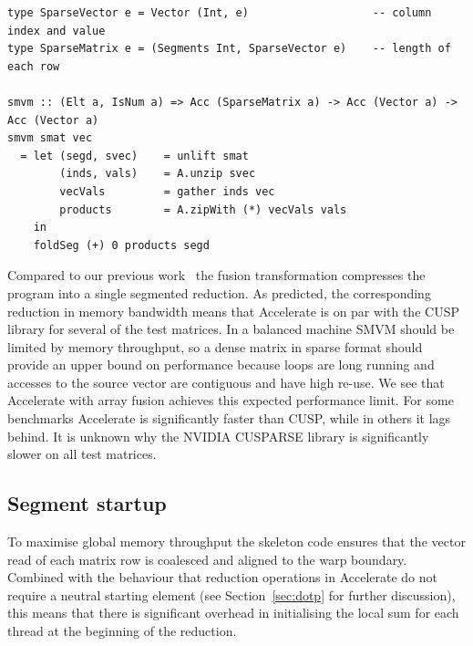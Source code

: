 \begin{lstlisting}[style=haskell
    ,float
    ,label=lst:smvm
    ,caption={Sparse-matrix vector multiplication}]
type SparseVector e = Vector (Int, e)                   -- column index and value
type SparseMatrix e = (Segments Int, SparseVector e)    -- length of each row

smvm :: (Elt a, IsNum a) => Acc (SparseMatrix a) -> Acc (Vector a) -> Acc (Vector a)
smvm smat vec
  = let (segd, svec)    = unlift smat
        (inds, vals)    = A.unzip svec
        vecVals         = gather inds vec
        products        = A.zipWith (*) vecVals vals
    in
    foldSeg (+) 0 products segd
\end{lstlisting}

Compared to our previous work~\cite{Chakravarty:2011fr} the fusion
transformation compresses the program into a single segmented reduction. As
predicted, the corresponding reduction in memory bandwidth means that Accelerate
is on par with the CUSP library for several of the test matrices. In a balanced
machine SMVM should be limited by memory throughput, so a dense matrix in
sparse format should provide an upper bound on performance because loops are
long running and accesses to the source vector are contiguous and have high
re-use. We see that Accelerate with array fusion achieves this expected
performance limit. For some benchmarks Accelerate is significantly faster than
CUSP, while in others it lags behind. It is unknown why the NVIDIA
CUSPARSE library is significantly slower on all test matrices.

\subsection{Segment startup}

To maximise global memory throughput the skeleton code ensures that the vector
read of each matrix row is coalesced and aligned to the warp boundary. Combined
with the behaviour that reduction operations in Accelerate do not require a
neutral starting element (see Section~\ref{sec:dotp} for further discussion),
this means that there is significant overhead in initialising the local sum for
each thread at the beginning of the reduction.


